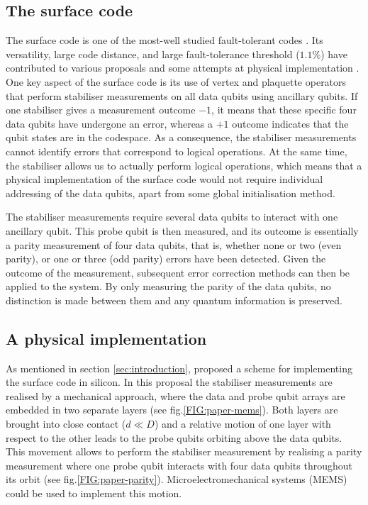 \subsection{The surface code}
The surface code is one of the most-well studied fault-tolerant codes \cite{Wang2011,Fowler2012}. Its versatility, large code distance, and large fault-tolerance threshold ($1.1\%$) have contributed to various proposals \cite{Fowler2012,Pica2014,Tosi2015,Hill2015,OGorman2016} and some attempts at physical implementation \cite{Barends2014,Kelly2015}. One key aspect of the surface code is its use of vertex and plaquette operators that perform stabiliser measurements on all data qubits using ancillary qubits. If one stabiliser gives a measurement outcome $-1$, it means that these specific four data qubits have undergone an error, whereas a $+1$ outcome indicates that the qubit states are in the codespace. As a consequence, the stabiliser measurements cannot identify errors that correspond to logical operations. At the same time, the stabiliser allows us to actually perform logical operations, which means that a physical implementation of the surface code would not require individual addressing of the data qubits, apart from some global initialisation method. 

The stabiliser measurements require several data qubits to interact with one ancillary qubit. This probe qubit is then measured, and its outcome is essentially a parity measurement of four data qubits, that is, whether none or two  (even parity), or one or three (odd parity) errors have been detected. Given the outcome of the measurement, subsequent error correction methods can then be applied to the system. By only measuring the parity of the data qubits, no distinction is made between them and any quantum information is preserved. 






\subsection{A physical implementation} \label{sec:PhysicalImplementation}
As mentioned in section \ref{sec:introduction},  \citet{OGorman2016} proposed a scheme for implementing the surface code in silicon. In this proposal the stabiliser measurements are realised by a mechanical approach, where the data and probe qubit arrays are embedded in two separate layers (see fig.\@ \ref{FIG:paper-mems}). Both layers are brought into close contact ($d\ll D$) and a relative motion of one layer with respect to the other leads to the probe qubits orbiting above the data qubits. This movement allows to perform the stabiliser measurement by realising a parity measurement where one probe qubit interacts with four data qubits throughout its orbit (see fig.\@ \ref{FIG:paper-parity}). Microelectromechanical systems (MEMS) could be used to implement this motion.


